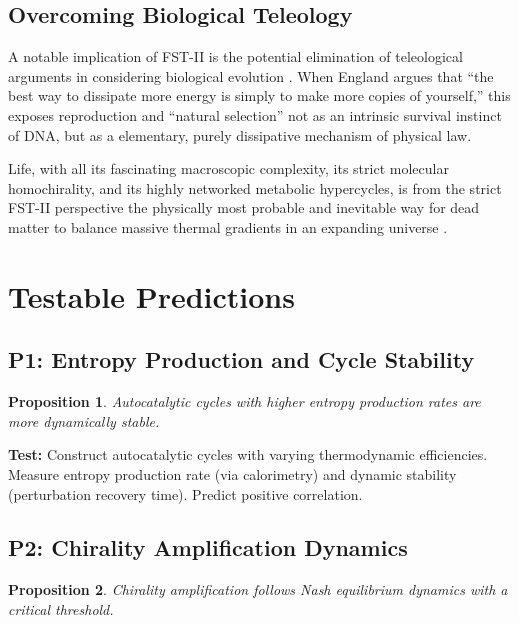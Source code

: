 \documentclass[12pt,a4paper]{article}
\newtheorem{proposition}{Proposition}
\theoremstyle{remark}
\begin{document}
\subsection{Overcoming Biological Teleology}

A notable implication of FST-II is the potential elimination of teleological arguments in considering biological evolution \citep{UnbecomingBeing}. When England argues that ``the best way to dissipate more energy is simply to make more copies of yourself,'' this exposes reproduction and ``natural selection'' not as an intrinsic survival instinct of DNA, but as a elementary, purely dissipative mechanism of physical law.

Life, with all its fascinating macroscopic complexity, its strict molecular homochirality, and its highly networked metabolic hypercycles, is from the strict FST-II perspective the physically most probable and inevitable way for dead matter to balance massive thermal gradients in an expanding universe \citep{Bioenergetics}.

\section{Testable Predictions}
\label{sec:predictions}

\subsection{P1: Entropy Production and Cycle Stability}

\begin{proposition}
Autocatalytic cycles with higher entropy production rates are more dynamically stable.
\end{proposition}

\textbf{Test:} Construct autocatalytic cycles with varying thermodynamic efficiencies. Measure entropy production rate (via calorimetry) and dynamic stability (perturbation recovery time). Predict positive correlation.

\subsection{P2: Chirality Amplification Dynamics}

\begin{proposition}
Chirality amplification follows Nash equilibrium dynamics with a critical threshold.
\end{proposition}
\end{document}
